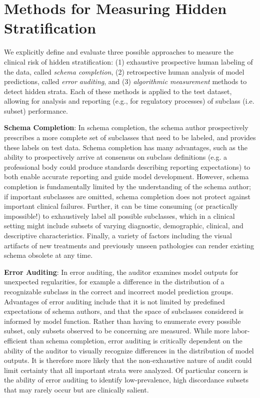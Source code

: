 \documentclass[sigconf,anonymous,review]{acmart}
\begin{document}
\section{Methods for Measuring Hidden Stratification}
\label{sec:methods}
We explicitly define and evaluate three possible approaches to measure the clinical risk of hidden stratification: (1) exhaustive prospective human labeling of the data, called \textit{schema completion}, (2) retrospective human analysis of model predictions, called \textit{error auditing}, and (3) \textit{algorithmic measurement} methods to detect hidden strata.  
Each of these methods is applied to the test dataset, allowing for analysis and reporting (e.g., for regulatory processes) of subclass (i.e. subset) performance.

\textbf{Schema Completion}: In schema completion, the schema author prospectively prescribes a more complete set of subclasses that need to be labeled, and provides these labels on test data. 
Schema completion has many advantages, such as the ability to prospectively arrive at consensus on subclass definitions (e.g. a professional body could produce standards describing reporting expectations) to both enable accurate reporting and guide model development.
However, schema completion is fundamentally limited by the understanding of the schema author; if important subclasses are omitted, schema completion does not protect against important clinical failures.
Further, it can be time consuming (or practically impossible!) to exhaustively label all possible subclasses, which in a clinical setting might include subsets of varying diagnostic, demographic, clinical, and descriptive characteristics.
Finally, a variety of factors including the visual artifacts of new treatments and previously unseen pathologies can render existing schema obsolete at any time.

\textbf{Error Auditing}: In error auditing, the auditor examines model outputs for unexpected regularities, for example a difference in the distribution of a recognizable subclass in the correct and incorrect model prediction groups. 
Advantages of error auditing include that it is not limited by predefined expectations of schema authors, and that the space of subclasses considered is informed by model function.
Rather than having to enumerate every possible subset, only subsets observed to be concerning are measured.
While more labor-efficient than schema completion, error auditing is critically dependent on the ability of the auditor to visually recognize differences in the distribution of model outputs.
It is therefore more likely that the non-exhaustive nature of audit could limit certainty that all important strata were analyzed.
Of particular concern is the ability of error auditing to identify low-prevalence, high discordance subsets that may rarely occur but are clinically salient.
\end{document}
